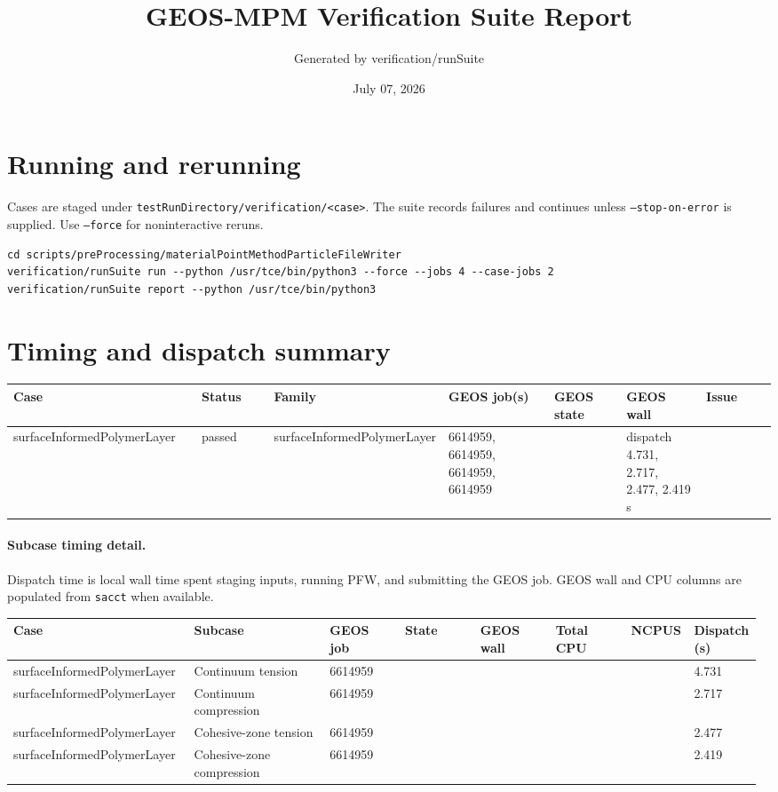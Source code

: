 \documentclass[10pt]{article}
\begin{document}
\title{GEOS-MPM Verification Suite Report}
\author{Generated by verification/runSuite}
\date{July 07, 2026}
\maketitle\tableofcontents\clearpage
\section{Running and rerunning}
Cases are staged under \texttt{testRunDirectory/verification/<case>}. The suite records failures and continues unless \texttt{--stop-on-error} is supplied. Use \texttt{--force} for noninteractive reruns.
\begin{lstlisting}[basicstyle=\small\ttfamily]
cd scripts/preProcessing/materialPointMethodParticleFileWriter
verification/runSuite run --python /usr/tce/bin/python3 --force --jobs 4 --case-jobs 2
verification/runSuite report --python /usr/tce/bin/python3
\end{lstlisting}
\section{Timing and dispatch summary}
\begin{landscape}{\tiny\begin{longtable}{p{0.25\linewidth}p{0.10\linewidth}p{0.19\linewidth}p{0.15\linewidth}p{0.10\linewidth}p{0.11\linewidth}p{0.13\linewidth}}\toprule Case & Status & Family & GEOS job(s) & GEOS state & GEOS wall & Issue \\ \midrule\endhead
surfaceInformedPolymerLayer & passed & surfaceInformedPolymerLayer & 6614959, 6614959, 6614959, 6614959 &  & dispatch 4.731, 2.717, 2.477, 2.419 s &  \\
\bottomrule\end{longtable}}\end{landscape}
\paragraph{Subcase timing detail.} Dispatch time is local wall time spent staging inputs, running PFW, and submitting the GEOS job. GEOS wall and CPU columns are populated from \texttt{sacct} when available.
\begin{landscape}{\tiny\begin{longtable}{p{0.24\linewidth}p{0.18\linewidth}p{0.10\linewidth}p{0.10\linewidth}p{0.10\linewidth}p{0.10\linewidth}p{0.07\linewidth}p{0.09\linewidth}}\toprule Case & Subcase & GEOS job & State & GEOS wall & Total CPU & NCPUS & Dispatch (s) \\ \midrule\endhead
surfaceInformedPolymerLayer & Continuum tension & 6614959 &  &  &  &  & 4.731 \\
surfaceInformedPolymerLayer & Continuum compression & 6614959 &  &  &  &  & 2.717 \\
surfaceInformedPolymerLayer & Cohesive-zone tension & 6614959 &  &  &  &  & 2.477 \\
surfaceInformedPolymerLayer & Cohesive-zone compression & 6614959 &  &  &  &  & 2.419 \\
\bottomrule\end{longtable}}\end{landscape}
\end{document}
